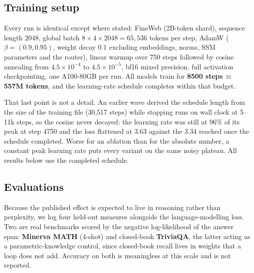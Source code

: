 \documentclass[11pt,a4paper]{article}
\begin{document}
\subsection{Training setup}

Every run is identical except where stated: FineWeb (2B-token shard), sequence length 2048, global
batch $8 \times 4 \times 2048 = 65{,}536$ tokens per step, AdamW ($\beta = (0.9, 0.95)$, weight
decay 0.1 excluding embeddings, norms, SSM parameters and the router), linear warmup over 750 steps
followed by cosine annealing from $4.5\times10^{-4}$ to $4.5\times10^{-5}$, bf16 mixed precision,
full activation checkpointing, one A100-80GB per run. All models train for
\textbf{8500 steps = 557M tokens}, and the learning-rate schedule completes within that budget.

That last point is not a detail. An earlier wave derived the schedule length from the size of the
training file (30{,}517 steps) while stopping runs on wall clock at 5--11k steps, so the cosine
never decayed: the learning rate was still at 96\% of its peak at step 4750 and the loss flattened
at 3.63 against the 3.34 reached once the schedule completed. Worse for an ablation than for the
absolute number, a constant peak learning rate puts every variant on the same noisy plateau. All
results below use the completed schedule.

\subsection{Evaluations}

Because the published effect is expected to live in reasoning rather than perplexity, we log four
held-out measures alongside the language-modelling loss. Two are real benchmarks scored by the
negative log-likelihood of the answer span: \textbf{Minerva MATH} (4-shot) and closed-book
\textbf{TriviaQA}, the latter acting as a parametric-knowledge control, since closed-book recall
lives in weights that a loop does not add. Accuracy on both is meaningless at this scale and is not
reported.
\end{document}
